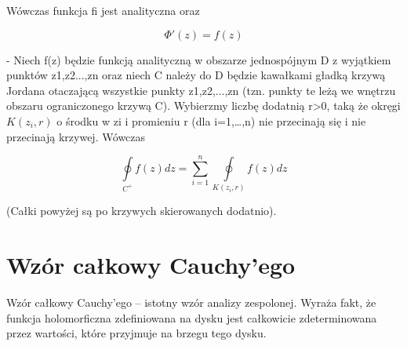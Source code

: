 \documentclass{article}
\begin{document}
Wówczas funkcja fi jest analityczna oraz

\begin{equation}
	\Phi '(z)=f(z)
\end{equation}

- Niech f(z) będzie funkcją analityczną w obszarze jednospójnym D z wyjątkiem punktów z1,z2...,zn oraz niech C należy do D będzie kawałkami gładką krzywą Jordana otaczającą wszystkie punkty z1,z2,...,zn (tzn. punkty te leżą we wnętrzu obszaru ograniczonego krzywą C). Wybierzmy liczbę dodatnią r>0, taką że okręgi $K(z_i,r)$ o środku w zi i promieniu r (dla i=1,…,n) nie przecinają się i nie przecinają krzywej. Wówczas

\begin{displaymath}
	\oint \limits _{C^{+}}f(z)dz=\sum _{i=1}^{n}\oint \limits _{K(z_{i},r)}f(z)dz
\end{displaymath}

(Całki powyżej są po krzywych skierowanych dodatnio).

\section*{Wzór całkowy Cauchy'ego}

Wzór całkowy Cauchy’ego – istotny wzór analizy zespolonej. Wyraża fakt, że funkcja holomorficzna zdefiniowana na dysku jest całkowicie zdeterminowana przez wartości, które przyjmuje na brzegu tego dysku. 
\end{document}
